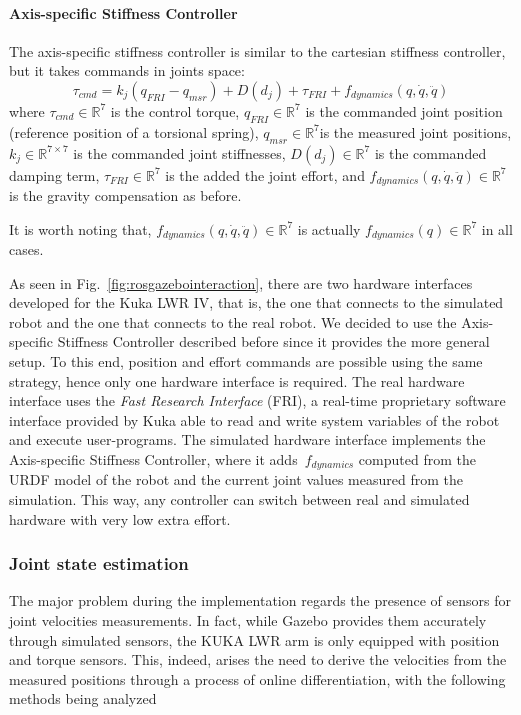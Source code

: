 \paragraph{Axis-specific Stiffness Controller}
The axis-specific stiffness controller is similar to the cartesian stiffness controller, but it takes commands in joints space:
\begin{equation}
\tau_{cmd} = k_j(q_{FRI} - q_{msr}) + D(d_j) + \tau_{FRI} + f_{dynamics}(q,\dot{q},\ddot{q})
\label{eq:axisspecificstiffnesscontroller}
\end{equation}
where $\tau_{cmd}\in \mathbb{R}^7$ is the control torque, $q_{FRI}\in\mathbb{R}^7$ is the commanded joint position (reference position of a torsional spring), $q_{msr}\in\mathbb{R}^7$is the measured joint positions, $k_j\in\mathbb{R}^{7\times 7}$ is the commanded joint stiffnesses, $D(d_j)\in\mathbb{R}^7$ is the commanded damping term, $\tau_{FRI}\in\mathbb{R}^7$ is the added the joint effort, and $f_{dynamics}(q,\dot{q},\ddot{q})\in\mathbb{R}^7$ is the gravity compensation as before.

It is worth noting that, $f_{dynamics}(q,\dot{q},\ddot{q})\in\mathbb{R}^7$ is actually $f_{dynamics}(q)\in\mathbb{R}^7$ in all cases.

As seen in Fig.~\ref{fig:rosgazebointeraction}, there are two hardware interfaces developed for the Kuka LWR IV, that is, the one that connects to the simulated robot and the one that connects to the real robot. We decided to use the Axis-specific Stiffness Controller described before since it provides the more general setup. To this end, position and effort commands are possible using the same strategy, hence only one hardware interface is required. The real hardware interface uses the \textit{Fast Research Interface} (FRI), a real-time proprietary software interface provided by Kuka able to read and write system variables of the robot and execute user-programs. The simulated hardware interface implements the Axis-specific Stiffness Controller, where it adds~$f_{dynamics}$ computed from the URDF model of the robot and the current joint values measured from the simulation. This way, any controller can switch between real and simulated hardware with very low extra effort.

\subsubsection{Joint state estimation}

The major problem during the implementation regards the presence of sensors for joint velocities measurements. In fact, while Gazebo provides them accurately through simulated sensors, the KUKA LWR arm is only equipped with position and torque sensors. This, indeed, arises the need to derive the velocities from the measured positions through a process of online differentiation, with the following methods being analyzed

